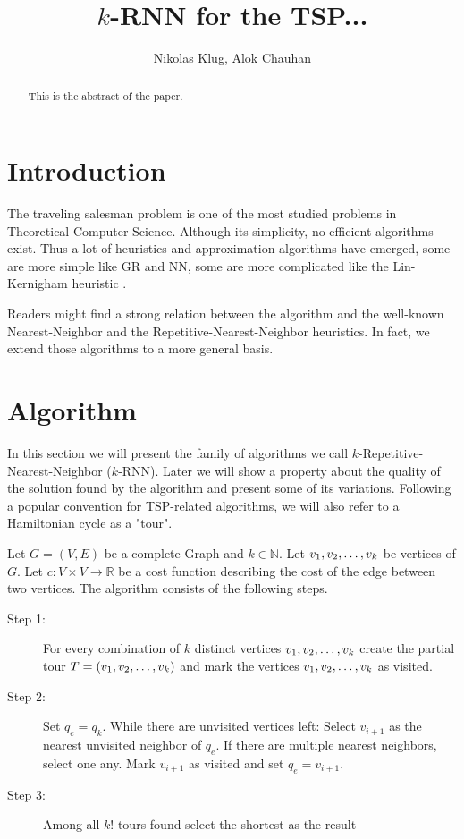 \documentclass[11pt]{article}
\title{$k$-RNN for the TSP...}
\author{Nikolas Klug, Alok Chauhan}
\begin{document}
	\maketitle
	\begin{abstract}
		This is the abstract of the paper.
	\end{abstract}

	\section{Introduction}
	\label{sec:introduction}
	The traveling salesman problem is one of the most studied problems in Theoretical Computer Science. 
	Although its simplicity, no efficient algorithms exist. 
	Thus a lot of heuristics and approximation algorithms have emerged, some are more simple like GR and NN, some are more complicated like the Lin-Kernigham heuristic \cite{LIN1973}.
	
	Readers might find a strong relation between the algorithm and the well-known Nearest-Neighbor and the Repetitive-Nearest-Neighbor heuristics. 
	In fact, we extend those algorithms to a more general basis.
	
	\section{Algorithm}
	\label{sec:algorithm}
	In this section we will present the family of algorithms we call $k$-Repetitive-Nearest-Neighbor ($k$-RNN). 
	Later we will show a property about the quality of the solution found by the algorithm and present some of its variations.
	Following a popular convention for TSP-related algorithms, we will also refer to a Hamiltonian cycle as a "tour". 	
	
	Let $G = (V, E)$ be a complete Graph and $k \in \mathbb{N}$. Let $v_1, v_2, \mathellipsis, v_k$ be vertices of $G$. 
	Let $c: V \times V \rightarrow \mathbb{R}$ be a cost function describing the cost of the edge between two vertices. 
	The algorithm consists of the following steps.
	
	
	\begin{description}
		\item[Step 1:] For every combination of $k$ distinct vertices $v_1, v_2, \mathellipsis, v_k$ create the partial tour $T = (v_1, v_2, \mathellipsis, v_k)$ and mark the vertices $v_1, v_2, \mathellipsis, v_k$ as visited.
		
		\item[Step 2:] Set $q_e = q_k$. While there are unvisited vertices left: 
		Select $v_{i+1}$ as the nearest unvisited neighbor of $q_e$. 
		If there are multiple nearest neighbors, select one any.
		Mark $v_{i+1}$ as visited and set $q_e = v_{i+1}$.
		
		\item[Step 3:] Among all $k!$ tours found select the shortest as the result
	\end{description}	
	
\end{document}
